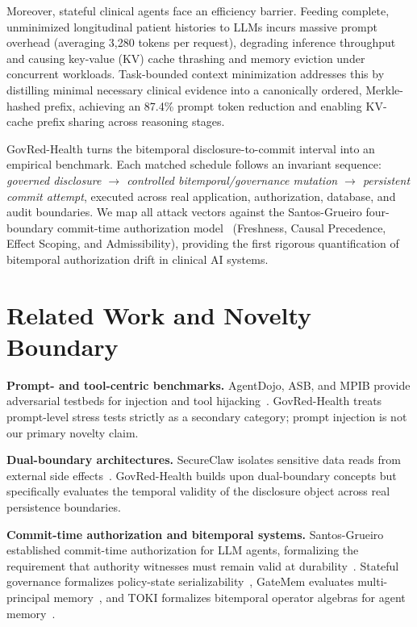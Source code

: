 \documentclass[conference,a4paper]{IEEEtran}
\begin{document}
Moreover, stateful clinical agents face an efficiency barrier. Feeding complete, unminimized longitudinal patient histories to LLMs incurs massive prompt overhead (averaging 3,280 tokens per request), degrading inference throughput and causing key-value (KV) cache thrashing and memory eviction under concurrent workloads. Task-bounded context minimization addresses this by distilling minimal necessary clinical evidence into a canonically ordered, Merkle-hashed prefix, achieving an 87.4\% prompt token reduction and enabling KV-cache prefix sharing across reasoning stages.

GovRed-Health turns the bitemporal disclosure-to-commit interval into an empirical benchmark. Each matched schedule follows an invariant sequence: \textit{governed disclosure $\rightarrow$ controlled bitemporal/governance mutation $\rightarrow$ persistent commit attempt}, executed across real application, authorization, database, and audit boundaries. We map all attack vectors against the Santos-Grueiro four-boundary commit-time authorization model~\cite{temporaryauth} (Freshness, Causal Precedence, Effect Scoping, and Admissibility), providing the first rigorous quantification of bitemporal authorization drift in clinical AI systems.

\section{Related Work and Novelty Boundary}
\textbf{Prompt- and tool-centric benchmarks.} AgentDojo, ASB, and MPIB provide adversarial testbeds for injection and tool hijacking~\cite{agentdojo,asb,mpib}. GovRed-Health treats prompt-level stress tests strictly as a secondary category; prompt injection is not our primary novelty claim.

\textbf{Dual-boundary architectures.} SecureClaw isolates sensitive data reads from external side effects~\cite{secureclaw}. GovRed-Health builds upon dual-boundary concepts but specifically evaluates the temporal validity of the disclosure object across real persistence boundaries.

\textbf{Commit-time authorization and bitemporal systems.} Santos-Grueiro established commit-time authorization for LLM agents, formalizing the requirement that authority witnesses must remain valid at durability~\cite{temporaryauth}. Stateful governance formalizes policy-state serializability~\cite{statefulgov}, GateMem evaluates multi-principal memory~\cite{gatemem}, and TOKI formalizes bitemporal operator algebras for agent memory~\cite{toki}.
\end{document}
